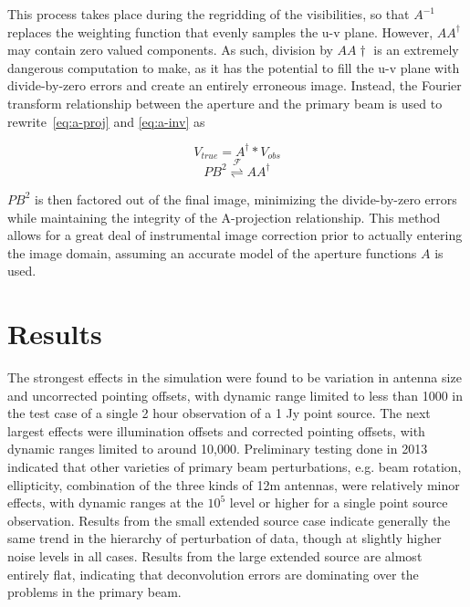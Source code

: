 \documentclass[11pt]{article}
\begin{document}
This process takes place during the regridding of the visibilities, so that 
$A^{-1}$ replaces the weighting function that evenly samples the u-v plane.  
However, $AA^{\dagger}$ may contain zero valued components. As such, division 
by $AA{\dagger}$ is an extremely dangerous computation to make, as it has the 
potential to fill the u-v plane with divide-by-zero errors and create an 
entirely erroneous image. Instead, the Fourier transform relationship between 
the aperture and the primary beam is used to rewrite~\eqref{eq:a-proj} and 
\eqref{eq:a-inv} as

\begin{equation}
    \label{eq:a-proj-cor}
    V_{true} = A^{\dagger} * V_{obs}
\end{equation}
\begin{equation}
    \label{eq:imcor}
    PB^2 \overset{\mathcal{F}}{\rightleftharpoons} AA^{\dagger}
\end{equation}

$PB^2$ is then factored out of the final image, minimizing the divide-by-zero 
errors while maintaining the integrity of the A-projection relationship. This 
method allows for a great deal of instrumental image correction prior to 
actually entering the image domain, assuming an accurate model of the aperture 
functions $A$ is used.

\section{Results}

The strongest effects in the simulation were found to be
variation in antenna size and uncorrected pointing offsets, with dynamic range 
limited to less than 1000 in the test case of a single 2 hour observation of a 
1 Jy point source. The next largest effects were illumination offsets and 
  corrected pointing offsets, with dynamic ranges limited to around 10,000.  
  Preliminary testing done in 2013 indicated that other varieties of primary 
  beam perturbations, e.g.  beam rotation, ellipticity, combination of the 
  three kinds of 12m antennas, were relatively minor effects, with dynamic 
  ranges at the $10^5$ level or higher for a single point source observation.  
  Results from the small extended source case indicate generally the same trend 
  in the hierarchy of perturbation of data, though at slightly higher noise 
  levels in all cases.  Results from the large extended source are almost 
  entirely flat, indicating that deconvolution errors are dominating over the 
  problems in the primary beam.
\end{document}
